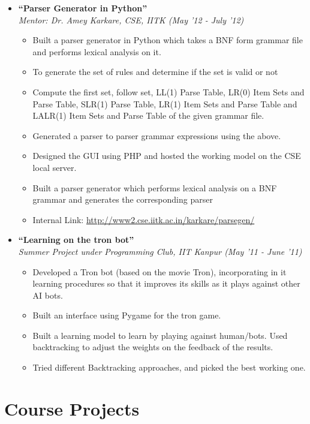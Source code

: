 \documentclass[margin,line]{resume}
\begin{document}
\begin{resume}
\begin{itemize}
  \item \large{\textbf{\textsf{``Parser Generator in Python''}}}
    \\ \small{\textit{Mentor: Dr. Amey Karkare, CSE, IITK (May '12 - July '12)}}
    \normalsize
    \begin{itemize}
      \item Built a parser generator in Python which takes a BNF form grammar file and performs lexical analysis on it.
      \item To generate the set of rules and determine if the set is valid or not
      \item Compute the first set, follow set, LL(1) Parse Table, LR(0) Item Sets and Parse Table, SLR(1) Parse Table, LR(1) Item Sets and Parse Table and LALR(1) Item Sets and Parse Table of the given grammar file.
      \item Generated a parser to parser grammar expressions using the above.
      \item Designed the GUI using PHP and hosted the working model on the CSE local server. 
      \item Built a parser generator which performs lexical analysis on a BNF grammar and generates the corresponding parser
      \item Internal Link: \url{http://www2.cse.iitk.ac.in/karkare/parsegen/}
    \end{itemize}

  \item \large{\textbf{\textsf{``Learning on the tron bot''}}}
    \\ \small{\textit{Summer Project under Programming Club, IIT Kanpur (May '11 - June '11)}}
    \normalsize
    \begin{itemize}
    \item Developed a Tron bot (based on the movie Tron), incorporating in it learning procedures so that it improves its skills as it plays against other AI bots.
    \item Built an interface using Pygame for the tron game.
    \item Built a learning model to learn by playing against human/bots. Used backtracking to adjust the weights on the feedback of the results.
    \item Tried different Backtracking approaches, and picked the best working one.
    \end{itemize}

  \end{itemize}

  \section{\mysidestyle Course Projects}


\end{resume}
\end{document}
